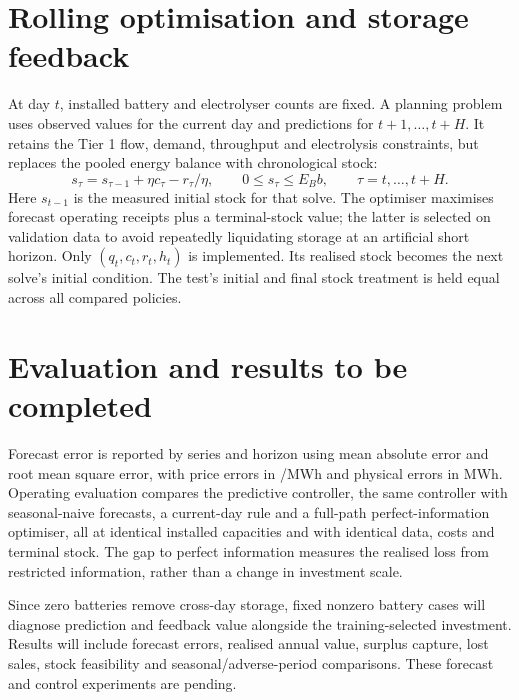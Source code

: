 \section{Rolling optimisation and storage feedback}\label{sec:rolling2}
At day \(t\), installed battery and electrolyser counts are fixed. A
planning problem uses observed values for the current day and predictions
for \(t+1,\ldots,t+H\). It retains the Tier 1 flow, demand, throughput and electrolysis
constraints, but replaces the pooled energy balance with chronological stock:
\begin{equation}
s_\tau=s_{\tau-1}+\eta c_\tau-r_\tau/\eta,
\qquad 0\le s_\tau\le E_Bb,
\qquad \tau=t,\ldots,t+H.
\end{equation}
Here \(s_{t-1}\) is the measured initial stock for that solve. The optimiser
maximises forecast operating receipts plus a terminal-stock value; the latter
is selected on validation data to avoid repeatedly liquidating storage at an
artificial short horizon. Only \((q_t,c_t,r_t,h_t)\) is implemented. Its
realised stock becomes the next solve's initial condition. The test's initial
and final stock treatment is held equal across all compared policies.

\section{Evaluation and results to be completed}\label{sec:evaluation2}
Forecast error is reported by series and horizon using mean absolute error
and root mean square error, with price errors in \gbp/MWh and physical
errors in MWh. Operating evaluation compares the predictive controller,
the same controller with seasonal-naive forecasts, a current-day rule and
a full-path perfect-information optimiser, all at identical installed
capacities and with identical data, costs and terminal stock. The gap to
perfect information measures the realised loss from restricted information,
rather than a change in investment scale.

Since zero batteries remove cross-day storage, fixed nonzero battery cases
will diagnose prediction and feedback value alongside the training-selected
investment. Results will include forecast errors, realised annual value,
surplus capture, lost sales, stock feasibility and seasonal/adverse-period
comparisons. These forecast and control experiments are pending.
